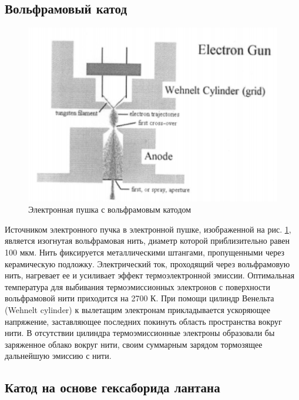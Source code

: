 \documentclass[12pt]{article}
\begin{document}
\subsection*{Вольфрамовый катод}

\begin{figure}[!ht]
\centering
\includegraphics[scale = 0.5]{pictures/tungsten.png}
\caption{Электронная пушка с вольфрамовым катодом}
\label{tungsten-cathode}
\end{figure}

Источником электронного пучка в электронной пушке, изображенной на рис. \ref{tungsten-cathode}, является изогнутая вольфрамовая нить, диаметр которой приблизительно равен 100 мкм. Нить фиксируется металлическими штангами, пропущенными через керамическую подложку. Электрический ток, проходящий через вольфрамовую нить, нагревает ее и усиливает эффект термоэлектронной эмиссии. Оптимальная температура для выбивания термоэмиссионных электронов с поверхности вольфрамовой нити приходится на 2700 К. При помощи цилиндр Венельта (Wehnelt cylinder) к вылетащим электронам прикладывается ускоряющее напряжение, заставляющее последних покинуть область пространства вокруг нити. В отсутствии цилиндра термоэмиссионные электроны образовали бы заряженное облако вокруг нити, своим суммарным зарядом тормозящее дальнейшую эмиссию с нити.

\subsection*{Катод на основе гексаборида лантана}
\end{document}
